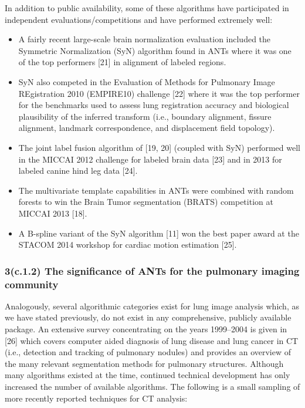 \documentclass[11pt,]{article}
\begin{document}
In addition to public availability, some of these algorithms have
participated in independent evaluations/competitions and have performed
extremely well:

\begin{itemize}
\itemsep1pt\parskip0pt
\item
  A fairly recent large-scale brain normalization evaluation included
  the Symmetric Normalization (SyN) algorithm found in ANTs where it was
  one of the top performers {[}21{]} in alignment of labeled regions.
\item
  SyN also competed in the Evaluation of Methods for Pulmonary Image
  REgistration 2010 (EMPIRE10) challenge {[}22{]} where it was the top
  performer for the benchmarks used to assess lung registration accuracy
  and biological plausibility of the inferred transform (i.e., boundary
  alignment, fissure alignment, landmark correspondence, and
  displacement field topology).
\item
  The joint label fusion algorithm of {[}19, 20{]} (coupled with SyN)
  performed well in the MICCAI 2012 challenge for labeled brain data
  {[}23{]} and in 2013 for labeled canine hind leg data {[}24{]}.
\item
  The multivariate template capabilities in ANTs were combined with
  random forests to win the Brain Tumor segmentation (BRATS) competition
  at MICCAI 2013 {[}18{]}.
\item
  A B-spline variant of the SyN algorithm {[}11{]} won the best paper
  award at the STACOM 2014 workshop for cardiac motion estimation
  {[}25{]}.
\end{itemize}

\subsubsection{3(c.1.2) The significance of ANTs for the pulmonary
imaging
community}\label{c.1.2-the-significance-of-ants-for-the-pulmonary-imaging-community}

Analogously, several algorithmic categories exist for lung image
analysis which, as we have stated previously, do not exist in any
comprehensive, publicly available package. An extensive survey
concentrating on the years 1999--2004 is given in {[}26{]} which covers
computer aided diagnosis of lung disease and lung cancer in CT (i.e.,
detection and tracking of pulmonary nodules) and provides an overview of
the many relevant segmentation methods for pulmonary structures.
Although many algorithms existed at the time, continued technical
development has only increased the number of available algorithms. The
following is a small sampling of more recently reported techniques for
CT analysis:
\end{document}
